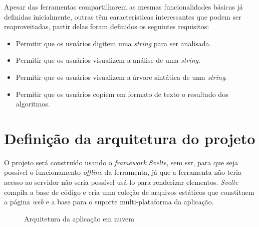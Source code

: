 Apesar das ferramentas compartilharem as mesmas funcionalidades básicas já definidas inicialmente, outras têm características interessantes que podem ser reaproveitadas, partir delas foram definidos os seguintes requisitos:
\begin{itemize}[label={$\sbullet$}]
  \item Permitir que os usuários digitem uma \textit{string} para ser analisada.
  \item Permitir que os usuários visualizem a análise de uma \textit{string}.
  \item Permitir que os usuários visualizem a árvore sintática de uma \textit{string}.
  \item Permitir que os usuários copiem em formato de texto o resultado dos algoritmos.
\end{itemize}

\section{Definição da arquitetura do projeto}
O projeto será construído usando o \textit{framework Svelte}, sem \gls{ssr}, para que seja possível o funcionamento \textit{offline} da ferramenta, já que a ferramenta não teria acesso ao servidor não seria possível usá-lo para renderizar elementos. \textit{Svelte} compila a base de código e cria uma coleção de arquivos estáticos que constituem a página \textit{web} e a base para o suporte multi-plataforma da aplicação.
\begin{figure}[ht]
  \centering
  \captionsetup{width=16cm}
  \caption{Arquitetura da aplicação em nuvem}
  \label{fig:arqremo}
\end{figure}

